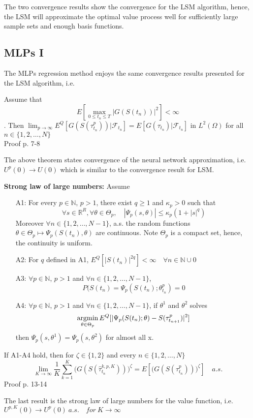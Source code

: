 The two convergence results show the convergence for the LSM algorithm, hence, the LSM will approximate the optimal value process well for sufficiently large sample sets and enough basis functions.

\subsection{MLPs I}
The MLPs regression method enjoys the same convergence results presented for the LSM algorithm, i.e.
\begin{theorem}\label{NNConvergence1}
Assume that 
$$E[\max_{0\leq t_n \leq T} |G(S(t_n))|^2]< \infty$$. 
Then $\lim_{p \to \infty} E^Q[G(S(\tau^{p}_{t_n}))| \mathcal{F}_{t_n}]= E[G(\tau_{t_n})|\mathcal{F}_{t_n}]$ in $L^2(\Omega)$ for all $n \in \{1,2,\ldots, N\}$\\
Proof p. 7-8 \parencite{Lelong19}
\end{theorem}
The above theorem states convergence of the neural network approximation, i.e. $U^{p}(0) \to U(0)$ which is similar to the convergence result for LSM. 
\begin{theorem}{\textbf{Strong law of large numbers: }}\label{NNConvergence2}
Assume
\begin{enumerate}
\item[A1:] For every $p\in \mathbb{N}$, $p>1$, there exist $q \geq 1$ and $\kappa_p>0$ such that
$$\forall s \in \mathbb{R}^{R}, \forall \theta \in \Theta_p, \quad |\Psi_p(s,\theta)| \leq \kappa_p (1+|s|^q) $$
Moreover $\forall n \in \{1,2,\ldots, N-1\}$, a.s. the random functions $\theta \in \Theta_p \mapsto \Psi_p(S(t_n), \theta)$ are continuous. Note $\Theta_p$ is a compact set, hence, the continuity is uniform.
\item[A2:] For $q$ defined in A1, $E^Q[|S(t_n)|^{2q}]<\infty \quad \forall n \in \mathbb{N} \cup 0$
\item[A3:] $\forall p \in \mathbb{N}$, $p>1$ and $\forall n \in \{1,2,\ldots, N-1\}$, 
$$P(S(t_n)=\Psi_{p}(S(t_n);\theta_{t_n}^{p})=0$$
\item[A4:] $\forall p \in \mathbb{N}$, $p>1$ and $\forall n \in \{1,2,\ldots, N-1\}$, if $\theta^{1}$ and $\theta^{2}$ solves 
\begin{align*}
\operatorname*{argmin}_{\theta \in \Theta_p} E^Q[|\Psi_p(S(t_n); \theta)- S(\tau_{t_{n+1}}^{p})|^2]
\end{align*}
then $\Psi_p(s,\theta^{1})=\Psi_p(s,\theta^{2})$ for almost all x.
\end{enumerate}
If A1-A4 hold, then for $\zeta\in \{1,2\}$ and every $n\in \{1,2,\ldots,N\}$
\begin{equation}
\lim_{K\to \infty} \dfrac{1}{K} \sum_{k=1}^{K} \bigg(G(S(\hat{\tau}_{t_n}^{k,p,K}))\bigg)^{\zeta} = E[\bigg(G(S(\tau_{t_n}^{p}))\bigg)^{\zeta}] \quad a.s.
\end{equation}
Proof p. 13-14 \parencite{Lelong19}
\end{theorem}
The last result is the strong law of large numbers for the value function, i.e. $U^{p,K}(0) \to U^{p}(0) \ a.s. \quad for \ K \to \infty$

